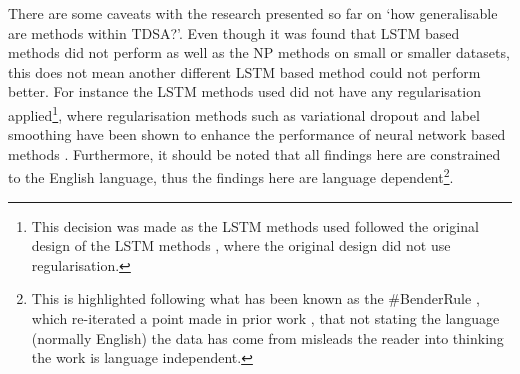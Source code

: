 There are some caveats with the research presented so far on `how generalisable are methods within TDSA?’. Even though it was found that LSTM based methods did not perform as well as the NP methods on small or smaller datasets, this does not mean another different LSTM based method could not perform better. For instance the LSTM methods used did not have any regularisation applied\footnote{This decision was made as the LSTM methods used followed the original design of the LSTM methods \citep{tang-etal-2016-effective}, where the original design did not use regularisation.}, where regularisation methods such as variational dropout \citep{gal2016theoretically} and label smoothing \citep{szegedy2016rethinking} have been shown to enhance the performance of neural network based methods \citep{gal2016theoretically, song2019attentional}. Furthermore, it should be noted that all findings here are constrained to the English language, thus the findings here are language dependent\footnote{This is highlighted following what has been known as the \#BenderRule \citep{bender2019rule}, which re-iterated a point made in prior work \citep{bender2011achieving}, that not stating the language (normally English) the data has come from misleads the reader into thinking the work is language independent.}.


